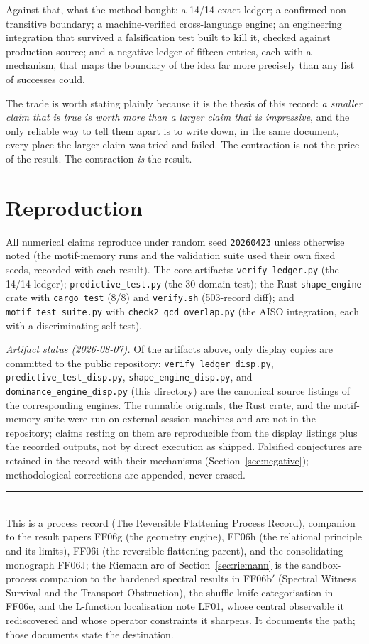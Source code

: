 \documentclass[11pt,a4paper]{article}
\newcommand{\seed}{\texttt{20260423}}
\theoremstyle{definition}
\theoremstyle{plain}
\begin{document}
Against that, what the method bought: a 14/14 exact ledger; a confirmed non-transitive boundary; a
machine-verified cross-language engine; an engineering integration that survived a falsification
test built to kill it, checked against production source; and a negative ledger of fifteen entries,
each with a mechanism, that maps the boundary of the idea far more precisely than any list of
successes could.

The trade is worth stating plainly because it is the thesis of this record: \emph{a smaller claim
that is true is worth more than a larger claim that is impressive}, and the only reliable way to
tell them apart is to write down, in the same document, every place the larger claim was tried and
failed. The contraction is not the price of the result. The contraction \emph{is} the result.

\appendix
\section{Reproduction}
All numerical claims reproduce under random seed \seed{} unless otherwise noted (the motif-memory
runs and the validation suite used their own fixed seeds, recorded with each result). The core
artifacts: \texttt{verify\_ledger.py} (the 14/14 ledger); \texttt{predictive\_test.py} (the
30-domain test); the Rust \texttt{shape\_engine} crate with \texttt{cargo test} (8/8) and
\texttt{verify.sh} (503-record diff); and \texttt{motif\_test\_suite.py} with
\texttt{check2\_gcd\_overlap.py} (the AISO integration, each with a discriminating self-test).

\emph{Artifact status (2026-08-07).} Of the artifacts above, only display copies are
committed to the public repository: \texttt{verify\_ledger\_disp.py},
\texttt{predictive\_test\_disp.py}, \texttt{shape\_engine\_disp.py}, and
\texttt{dominance\_engine\_disp.py} (this directory) are the canonical source listings
of the corresponding engines. The runnable originals, the Rust crate, and the
motif-memory suite were run on external session machines and are not in the
repository; claims resting on them are reproducible from the display listings plus
the recorded outputs, not by direct execution as shipped.
Falsified conjectures are retained in the record with their mechanisms (Section~\ref{sec:negative});
methodological corrections are appended, never erased.

\vspace{1em}
\noindent\rule{\linewidth}{0.4pt}\\
\small This is a process record (\textsf{The Reversible Flattening Process Record}), companion to the result papers
\textsf{FF06g} (the geometry engine), \textsf{FF06h} (the relational principle and its limits),
\textsf{FF06i} (the reversible-flattening parent), and the consolidating monograph \textsf{FF06J};
the Riemann arc of Section~\ref{sec:riemann} is the sandbox-process companion to the hardened
spectral results in \textsf{FF06b$'$} (Spectral Witness Survival and the Transport Obstruction), the
shuffle-knife categorisation in \textsf{FF06e}, and the L-function localisation note \textsf{LF01},
whose central observable it rediscovered and whose operator constraints it sharpens.
It documents the path; those documents state the destination.
\end{document}
